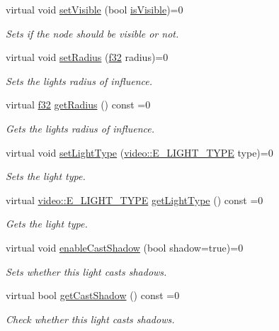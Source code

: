 \begin{DoxyCompactItemize}
virtual void \hyperlink{classirr_1_1scene_1_1ILightSceneNode_a3a6a6681a665ec4c214cda8a84a29337}{set\+Visible} (bool \hyperlink{classirr_1_1scene_1_1ISceneNode_a9e8e4e8be0055e8182eb26b055abf339}{is\+Visible})=0
\begin{DoxyCompactList}\small\item\em Sets if the node should be visible or not. \end{DoxyCompactList}\item 
virtual void \hyperlink{classirr_1_1scene_1_1ILightSceneNode_a7da64c8c4776988a39927827f2c3f364}{set\+Radius} (\hyperlink{namespaceirr_a0277be98d67dc26ff93b1a6a1d086b07}{f32} radius)=0
\begin{DoxyCompactList}\small\item\em Sets the light\textquotesingle{}s radius of influence. \end{DoxyCompactList}\item 
virtual \hyperlink{namespaceirr_a0277be98d67dc26ff93b1a6a1d086b07}{f32} \hyperlink{classirr_1_1scene_1_1ILightSceneNode_a4ce3cd789ed3adabd381ff7f915861a0}{get\+Radius} () const =0
\begin{DoxyCompactList}\small\item\em Gets the light\textquotesingle{}s radius of influence. \end{DoxyCompactList}\item 
virtual void \hyperlink{classirr_1_1scene_1_1ILightSceneNode_a18b3c0ba831bdc9166db341a35701c9b}{set\+Light\+Type} (\hyperlink{namespaceirr_1_1video_aaf0e02f6f83cc35cf9e764bf18400d39}{video\+::\+E\+\_\+\+L\+I\+G\+H\+T\+\_\+\+T\+Y\+PE} type)=0
\begin{DoxyCompactList}\small\item\em Sets the light type. \end{DoxyCompactList}\item 
virtual \hyperlink{namespaceirr_1_1video_aaf0e02f6f83cc35cf9e764bf18400d39}{video\+::\+E\+\_\+\+L\+I\+G\+H\+T\+\_\+\+T\+Y\+PE} \hyperlink{classirr_1_1scene_1_1ILightSceneNode_a47e327388c75391ebc910369af7eedce}{get\+Light\+Type} () const =0
\begin{DoxyCompactList}\small\item\em Gets the light type. \end{DoxyCompactList}\item 
virtual void \hyperlink{classirr_1_1scene_1_1ILightSceneNode_a1520d051fe04bc8c5c8975fb3908161b}{enable\+Cast\+Shadow} (bool shadow=true)=0
\begin{DoxyCompactList}\small\item\em Sets whether this light casts shadows. \end{DoxyCompactList}\item 
virtual bool \hyperlink{classirr_1_1scene_1_1ILightSceneNode_a5ba3a03fc0cfbad7dd8ce2f338a1991a}{get\+Cast\+Shadow} () const =0
\begin{DoxyCompactList}\small\item\em Check whether this light casts shadows. \end{DoxyCompactList}\end{DoxyCompactItemize}
